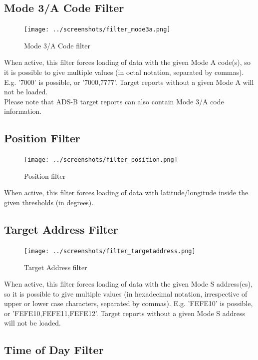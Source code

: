 \subsection{Mode 3/A Code Filter}

\begin{figure}[H]
  \center
    \texttt{[image: ../screenshots/filter\_mode3a.png]}
  \caption{Mode 3/A Code filter}
\end{figure}

When active, this filter forces loading of data with the given Mode A code(s), so it is possible to give multiple values (in octal notation, separated by commas). E.g. '7000' is possible, or '7000,7777'. Target reports without a given Mode A will not be loaded. \\

Please note that ADS-B target reports can also contain Mode 3/A code information.

\subsection{Position Filter}

\begin{figure}[H]
  \center
    \texttt{[image: ../screenshots/filter\_position.png]}
  \caption{Position filter}
\end{figure}

When active, this filter forces loading of data with latitude/longitude inside the given thresholds (in degrees).

\subsection{Target Address Filter}

\begin{figure}[H]
  \center
    \texttt{[image: ../screenshots/filter\_targetaddress.png]}
  \caption{Target Address filter}
\end{figure}

When active, this filter forces loading of data with the given Mode S address(es), so it is possible to give multiple values (in hexadecimal notation, irrespective of upper or lower case characters, separated by commas). E.g. 'FEFE10' is possible, or 'FEFE10,FEFE11,FEFE12'. Target reports without a given Mode S address will not be loaded.

\subsection{Time of Day Filter}


